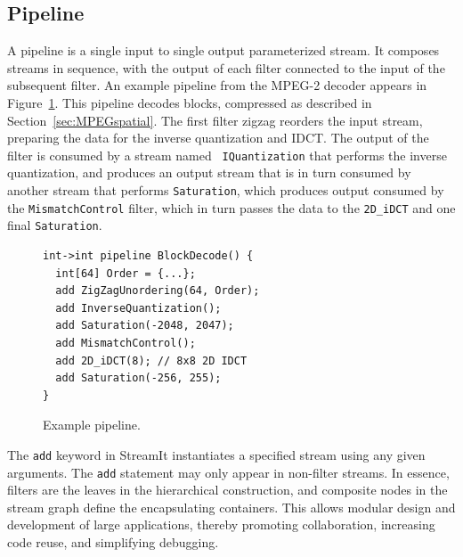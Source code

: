 \subsection{Pipeline}
A pipeline is a single input to single output parameterized
stream. It composes streams in sequence, with the output of
each filter connected to the input of the 
subsequent filter. 
An example pipeline from the
MPEG-2 decoder appears in Figure~\ref{fig:decoder-pipeline}.
This pipeline decodes blocks, compressed as described in Section~\ref{sec:MPEGspatial}. 
The first filter zigzag reorders the input
stream, preparing the data for the inverse quantization and
IDCT. The output of the filter is consumed by a stream named {\tt
IQuantization} that performs the inverse quantization, and produces an
output stream that is in turn consumed by another stream that performs 
\texttt{Saturation}, which produces output consumed by the \texttt{MismatchControl} filter,
which in turn passes the data to the \texttt{2D\_iDCT} and one final \texttt{Saturation}.

\begin{figure}
  \begin{center}
    \begin{minipage}{3.5in}
      \begin{small}
        \begin{verbatim}
int->int pipeline BlockDecode() {
  int[64] Order = {...};
  add ZigZagUnordering(64, Order);
  add InverseQuantization();
  add Saturation(-2048, 2047);
  add MismatchControl();
  add 2D_iDCT(8); // 8x8 2D IDCT
  add Saturation(-256, 255);
}
        \end{verbatim}
      \end{small}
    \end{minipage}
  \end{center}
  \caption{Example pipeline.}
  \label{fig:decoder-pipeline}
\end{figure}

The {\tt add} keyword in StreamIt instantiates a specified stream
using any given arguments. The {\tt add} statement may only appear in
non-filter streams.  In essence, filters are the leaves in the
hierarchical construction, and composite nodes in the stream graph
define the encapsulating containers. This allows modular design
and development of large applications, thereby promoting
collaboration, increasing code reuse, and simplifying debugging.

